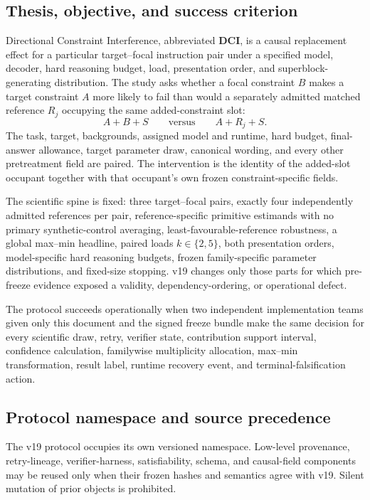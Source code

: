 \documentclass[11pt,a4paper]{article}
\begin{document}
\subsection{Thesis, objective, and success criterion}
Directional Constraint Interference, abbreviated \textbf{DCI}, is a causal replacement effect for a particular target--focal instruction pair under a specified model, decoder, hard reasoning budget, load, presentation order, and superblock-generating distribution. The study asks whether a focal constraint $B$ makes a target constraint $A$ more likely to fail than would a separately admitted matched reference $R_j$ occupying the same added-constraint slot:
\[
A+B+S \qquad\text{versus}\qquad A+R_j+S.
\]
The task, target, backgrounds, assigned model and runtime, hard budget, final-answer allowance, target parameter draw, canonical wording, and every other pretreatment field are paired. The intervention is the identity of the added-slot occupant together with that occupant's own frozen constraint-specific fields.

The scientific spine is fixed: three target--focal pairs, exactly four independently admitted references per pair, reference-specific primitive estimands with no primary synthetic-control averaging, least-favourable-reference robustness, a global max--min headline, paired loads $k\in\{2,5\}$, both presentation orders, model-specific hard reasoning budgets, frozen family-specific parameter distributions, and fixed-size stopping. v19 changes only those parts for which pre-freeze evidence exposed a validity, dependency-ordering, or operational defect.

The protocol succeeds operationally when two independent implementation teams given only this document and the signed freeze bundle make the same decision for every scientific draw, retry, verifier state, contribution support interval, confidence calculation, familywise multiplicity allocation, max--min transformation, result label, runtime recovery event, and terminal-falsification action.

\subsection{Protocol namespace and source precedence}
The v19 protocol occupies its own versioned namespace. Low-level provenance, retry-lineage, verifier-harness, satisfiability, schema, and causal-field components may be reused only when their frozen hashes and semantics agree with v19. Silent mutation of prior objects is prohibited.
\end{document}
